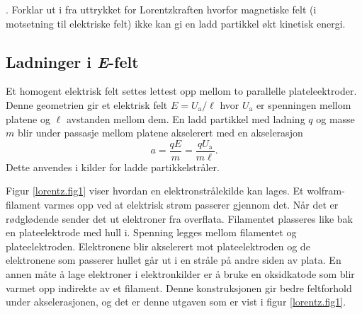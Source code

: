 \documentclass[../Elmag-labhefte-2020.tex]{subfiles}
\begin{document}
{. Forklar ut i fra uttrykket for Lorentzkraften hvorfor magnetiske felt (i motsetning til elektriske felt) ikke kan gi en ladd partikkel økt kinetisk energi.}

\subsection{Ladninger i \textsl{E}-felt}

Et homogent elektrisk felt settes lettest opp mellom to parallelle plateleektroder. Denne geometrien gir et elektrisk felt $E = U_\mathrm{a}/\ell$ hvor $U_\mathrm{a}$ er spenningen mellom platene og $\ell$ avstanden mellom dem. En ladd partikkel med ladning $q$ og masse $m$ blir under passasje mellom platene akselerert med en akselerasjon 
\begin{equation}
    a = \frac{q E}{m} = \frac{q U_\mathrm{a}}{m\ell}.
    \label{eq:lorentz.aksel}
\end{equation}
%
Dette anvendes i kilder for ladde partikkelstråler. 

Figur \ref{lorentz.fig1} viser hvordan en elektronstrålekilde kan lages. Et wolfram-filament varmes opp ved at elektrisk strøm passerer gjennom det. Når det er rødglødende sender det ut elektroner fra overflata. Filamentet plasseres like bak en plateelektrode med hull i. Spenning legges mellom filamentet og plateelektroden. Elektronene blir akselerert mot plateelektroden og de elektronene som passerer hullet går ut i en stråle på andre siden av plata. En annen måte å lage elektroner i elektronkilder er å bruke en oksidkatode som blir varmet opp indirekte av et filament. Denne konstruksjonen gir bedre feltforhold under akselerasjonen, og det er denne utgaven som er vist i figur \ref{lorentz.fig1}.
%
\end{document}

